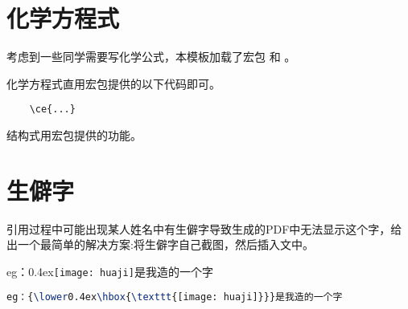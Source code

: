 \section{化学方程式}
考虑到一些同学需要写化学公式，本模板加载了宏包   和 。 

化学方程式直用宏包提供的以下代码即可。
\begin{lstlisting}
	\ce{...}
\end{lstlisting} 
\begin{center}
\end{center}
结构式用宏包提供的功能。
\begin{center}
\end{center}

\section{生僻字}
引用过程中可能出现某人姓名中有生僻字导致生成的PDF中无法显示这个字，给出一个最简单的解决方案:将生僻字自己截图，然后插入文中。

eg：{\lower0.4ex\hbox{\texttt{[image: huaji]}}}是我造的一个字
\begin{lstlisting}[language=TeX]
	eg：{\lower0.4ex\hbox{\texttt{[image: huaji]}}}是我造的一个字
\end{lstlisting}